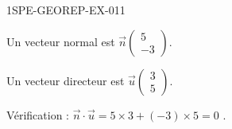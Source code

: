 \begin{corrige}{1SPE-GEOREP-EX-011}


Un vecteur normal est $\vec{n}\begin{pmatrix} 5 \\ -3 \end{pmatrix}$.

Un vecteur directeur est $\vec{u}\begin{pmatrix} 3 \\ 5 \end{pmatrix}$.

Vérification : $\vec{n} \cdot \vec{u} = 5 \times 3 + (-3) \times 5 = 0$ \checkmark.

\end{corrige}
